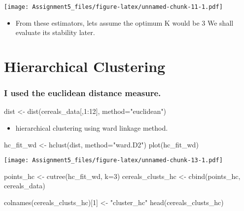 \documentclass[
]{article}
\newenvironment{Shaded}{\begin{snugshade}}{\end{snugshade}}
\newcommand{\AttributeTok}[1]{\textcolor[rgb]{0.77,0.63,0.00}{#1}}
\newcommand{\DecValTok}[1]{\textcolor[rgb]{0.00,0.00,0.81}{#1}}
\newcommand{\FunctionTok}[1]{\textcolor[rgb]{0.00,0.00,0.00}{#1}}
\newcommand{\NormalTok}[1]{#1}
\newcommand{\OtherTok}[1]{\textcolor[rgb]{0.56,0.35,0.01}{#1}}
\newcommand{\SpecialCharTok}[1]{\textcolor[rgb]{0.00,0.00,0.00}{#1}}
\newcommand{\StringTok}[1]{\textcolor[rgb]{0.31,0.60,0.02}{#1}}
\providecommand{\tightlist}{%
  \setlength{\itemsep}{0pt}\setlength{\parskip}{0pt}}
\begin{document}
\texttt{[image: Assignment5\_files/figure-latex/unnamed-chunk-11-1.pdf]}

\begin{itemize}
\tightlist
\item
  From these estimators, lets assume the optimum K would be 3 We shall
  evaluate its stability later.
\end{itemize}

\hypertarget{hierarchical-clustering}{%
\section{Hierarchical Clustering}\label{hierarchical-clustering}}

\hypertarget{i-used-the-euclidean-distance-measure.}{%
\subsubsection{I used the euclidean distance
measure.}\label{i-used-the-euclidean-distance-measure.}}

\begin{Shaded}
\begin{Highlighting}[]
\NormalTok{dist }\OtherTok{\textless{}{-}} \FunctionTok{dist}\NormalTok{(cereals\_data[,}\DecValTok{1}\SpecialCharTok{:}\DecValTok{12}\NormalTok{], }\AttributeTok{method=}\StringTok{"euclidean"}\NormalTok{)}
\end{Highlighting}
\end{Shaded}

\begin{itemize}
\tightlist
\item
  hierarchical clustering using ward linkage method.
\end{itemize}

\begin{Shaded}
\begin{Highlighting}[]
\NormalTok{hc\_fit\_wd }\OtherTok{\textless{}{-}} \FunctionTok{hclust}\NormalTok{(dist, }\AttributeTok{method=}\StringTok{"ward.D2"}\NormalTok{)}
\FunctionTok{plot}\NormalTok{(hc\_fit\_wd)}
\end{Highlighting}
\end{Shaded}

\texttt{[image: Assignment5\_files/figure-latex/unnamed-chunk-13-1.pdf]}

\begin{Shaded}
\begin{Highlighting}[]
\NormalTok{points\_hc }\OtherTok{\textless{}{-}} \FunctionTok{cutree}\NormalTok{(hc\_fit\_wd, }\AttributeTok{k=}\DecValTok{3}\NormalTok{)}
\NormalTok{cereals\_clusts\_hc }\OtherTok{\textless{}{-}} \FunctionTok{cbind}\NormalTok{(points\_hc, cereals\_data)}

\FunctionTok{colnames}\NormalTok{(cereals\_clusts\_hc)[}\DecValTok{1}\NormalTok{] }\OtherTok{\textless{}{-}} \StringTok{"cluster\_hc"}
\FunctionTok{head}\NormalTok{(cereals\_clusts\_hc)}
\end{Highlighting}
\end{Shaded}
\end{document}
